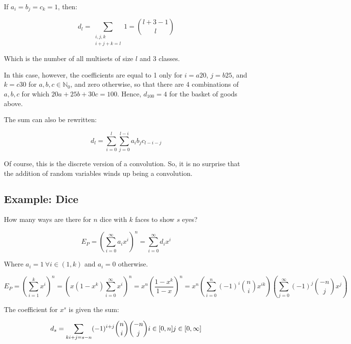 If $a_i = b_j = c_k = 1$, then:

\begin{equation}
d_l = \sum_{\begin{array}{c}i,j,k\\i+j+k=l\end{array}} 1 = {l + 3 - 1 \choose l}
\end{equation}

Which is the number of all multisets of size $l$ and 3 classes. 

In this case, however, the coefficients are equal to 1 only for $i=a20$, $j=b25$, and $k=c30$ for $a,b,c \in \mathbb{N}_0$, and zero otherwise, so that there are 4 combinations of $a,b,c$ for which $20a+25b+30c=100$. Hence, $d_{100} = 4$ for the basket of goods above.

The sum can also be rewritten:

\begin{equation}
d_l = \sum^l_{i=0}\sum^{l-i}_{j=0} a_i b_j c_{l-i-j}
\end{equation}


Of course, this is the discrete version of a convolution. So, it is no surprise that the addition of random variables winds up being a convolution.

\subsection{Example: Dice}

How many ways are there for $n$ dice with $k$ faces to show $s$ eyes?

\begin{equation}
E_P = \left(\sum_{i=0}^\infty a_i x^i\right)^n = \sum_{i=0}^{\infty}d_i x^i
\end{equation}

Where $a_i = 1\ \forall i\in(1,k)$ and $a_i = 0$ otherwise.

\begin{equation}
E_P = \left(\sum_{i=1}^k x^i\right)^n = \left(x(1-x^k)\sum_{i=0}^\infty x^i\right)^n = x^n\left(\frac{1-x^k}{1-x}\right)^n = x^n \left(\sum_{i=0}^n (-1)^i {n \choose i} x^{ik}\right)\left(\sum_{j=0}^{\infty} (-1)^j {-n \choose j} x^j\right)
\end{equation}

The coefficient for $x^s$ is given the sum:

\begin{equation}
d_s = \sum_{ki+j=s-n} (-1)^{i+j}{n \choose i}{-n \choose j}\\
i \in [0,n] \\
j \in [0,\infty]
\end{equation}

